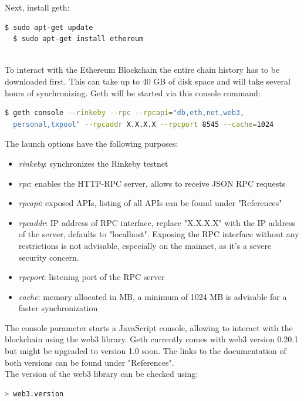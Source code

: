 Next, install geth:
\begin{lstlisting}[language=bash]
  $ sudo apt-get update
  $ sudo apt-get install ethereum
\end{lstlisting}
\leavevmode
\\
To interact with the Ethereum Blockchain the entire chain history has to be downloaded first. This can take up to 40 GB of disk space and will take several hours of synchronizing. Geth will be started via this console command:
\begin{lstlisting}[language=bash, showstringspaces=false]
  $ geth console --rinkeby --rpc --rpcapi="db,eth,net,web3,
  personal,txpool" --rpcaddr X.X.X.X --rpcport 8545 --cache=1024
\end{lstlisting}

The launch options have the following purposes\cite{cli-options}:
\begin{itemize}
    \item \textit{rinkeby}: synchronizes the Rinkeby testnet
    \item \textit{rpc}: enables the HTTP-RPC server, allows to receive JSON RPC requests
    \item \textit{rpcapi}: exposed APIs, listing of all APIs can be found under "References"\cite{json-rpc}\cite{management-apis}
    \item \textit{rpcaddr}: IP address of RPC interface, replace "X.X.X.X" with the IP address of the server, defaults to "localhost". Exposing the RPC interface without any restrictions is not advisable, especially on the mainnet, as it’s a severe security concern.
    \item \textit{rpcport}: listening port of the RPC server
    \item \textit{cache}: memory allocated in MB, a minimum of 1024 MB is advisable for a faster synchronization
\end{itemize}
The console parameter starts a JavaScript console, allowing to interact with the blockchain using the web3 library. Geth currently comes with web3 version 0.20.1\cite{javascript-0.20} but might be upgraded to version 1.0\cite{javascript-1.0} soon. The links to the documentation of both versions can be found under "References".
\\
The version of the web3 library can be checked using:

\begin{lstlisting}[language=bash]
  > web3.version
\end{lstlisting}

